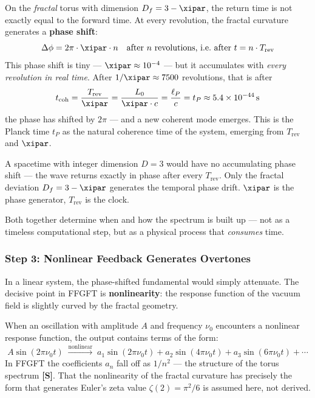 On the \emph{fractal} torus with dimension $D_f = 3 - \xipar$, the return time
is not exactly equal to the forward time. At every revolution, the fractal
curvature generates a \textbf{phase shift}:
\begin{equation}
    \Delta\phi = 2\pi \cdot \xipar \cdot n
    \quad \text{after } n \text{ revolutions, i.e.\ after } t = n \cdot T_\text{rev}
\end{equation}
This phase shift is tiny — $\xipar \approx 10^{-4}$ — but it accumulates with
\emph{every revolution in real time}. After $1/\xipar \approx 7500$ revolutions,
that is after
\begin{equation}
    t_\text{coh} = \frac{T_\text{rev}}{\xipar} = \frac{L_0}{\xipar \cdot c}
    = \frac{\ell_P}{c} = t_P \approx 5.4 \times 10^{-44}\,\text{s}
\end{equation}
the phase has shifted by $2\pi$ — and a new coherent mode emerges.
This is the Planck time $t_P$ as the natural coherence time of the system,
emerging from $T_\text{rev}$ and $\xipar$.

\begin{technical}
A spacetime with integer dimension $D = 3$ would have no accumulating phase shift —
the wave returns exactly in phase after every $T_\text{rev}$. Only the fractal
deviation $D_f = 3 - \xipar$ generates the temporal phase drift. $\xipar$ is the
phase generator, $T_\text{rev}$ is the clock.

Both together determine when and how the spectrum is built up — not as a timeless
computational step, but as a physical process that \emph{consumes} time.
\end{technical}

\subsubsection*{Step 3: Nonlinear Feedback Generates Overtones}

In a linear system, the phase-shifted fundamental would simply attenuate.
The decisive point in FFGFT is \textbf{nonlinearity}: the response function of the
vacuum field is slightly curved by the fractal geometry.

When an oscillation with amplitude $A$ and frequency $\nu_0$ encounters a
nonlinear response function, the output contains terms of the form:
\begin{equation}
    A \sin(2\pi \nu_0 t) \;\xrightarrow{\text{nonlinear}}\;
    a_1 \sin(2\pi \nu_0 t) + a_2 \sin(4\pi \nu_0 t) + a_3 \sin(6\pi \nu_0 t) + \cdots
\end{equation}
In FFGFT the coefficients $a_n$ fall off as $1/n^2$ — the structure of the torus
spectrum \textbf{[S]}. That the nonlinearity of the fractal curvature has
precisely the form that generates Euler's zeta value $\zeta(2) = \pi^2/6$ is
assumed here, not derived.

